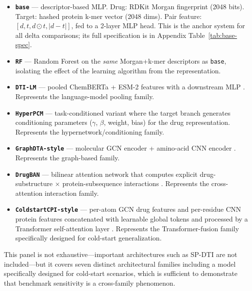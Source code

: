 \documentclass[referee,pdflatex,sn-basic,Numbered]{sn-jnl}
\begin{document}
\begin{itemize}
    \item \textbf{\texttt{base}} — descriptor-based MLP. Drug: RDKit Morgan fingerprint (2048 bits). Target: hashed protein k-mer vector (2048 dims). Pair feature: $[d, t, d \odot t, |d-t|]$, fed to a 2-layer MLP head. This is the anchor system for all delta comparisons; its full specification is in Appendix Table~\ref{tab:base-spec}.
    \item \textbf{\texttt{RF}} — Random Forest on the \emph{same} Morgan+k-mer descriptors as \texttt{base}, isolating the effect of the learning algorithm from the representation.
    \item \textbf{\texttt{DTI-LM}} — pooled ChemBERTa + ESM-2 features with a downstream MLP \citep{ahmed2024dtilm}. Represents the language-model pooling family.
    \item \textbf{\texttt{HyperPCM}} — task-conditioned variant where the target branch generates conditioning parameters ($\gamma$, $\beta$, weight, bias) for the drug representation. Represents the hypernetwork/conditioning family.
    \item \textbf{\texttt{GraphDTA-style}} — molecular GCN encoder + amino-acid CNN encoder \citep{nguyen2021graphdta}. Represents the graph-based family.
    \item \textbf{\texttt{DrugBAN}} — bilinear attention network that computes explicit drug-substructure $\times$ protein-subsequence interactions \citep{bai2023drugban}. Represents the cross-attention interaction family.
    \item \textbf{\texttt{ColdstartCPI-style}} — per-atom GCN drug features and per-residue CNN protein features concatenated with learnable global tokens and processed by a Transformer self-attention layer \citep{zhao2025coldstartcpi}. Represents the Transformer-fusion family specifically designed for cold-start generalization.
\end{itemize}

This panel is not exhaustive—important architectures such as SP-DTI \citep{liu2025spdti} are not included—but it covers seven distinct architectural families including a model specifically designed for cold-start scenarios, which is sufficient to demonstrate that benchmark sensitivity is a cross-family phenomenon.
\end{document}
